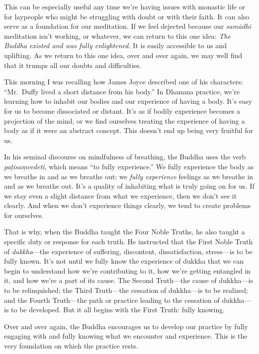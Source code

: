 This can be especially useful any time we're having issues with 
monastic life or for laypeople who might be struggling with doubt or 
with their faith. It can also serve as a foundation for our meditation. 
If we feel dejected because our \emph{samādhi} meditation isn't 
working, or whatever, we can return to this one idea: \emph{The Buddha 
existed and was fully enlightened.} It is easily accessible to us and 
uplifting. As we return to this one idea, over and over again, we may 
well find that it trumps all our doubts and difficulties.


This morning I was recalling how James Joyce described one of his 
characters: ``Mr. Duffy lived a short distance from his body.'' In 
Dhamma practice, we're learning how to inhabit our bodies and our 
experience of having a body. It's easy for us to become dissociated or 
distant. It's as if bodily experience becomes a projection of the mind, 
or we find ourselves treating the experience of having a body as if it 
were an abstract concept. This doesn't end up being very fruitful for 
us.

In his seminal discourse on mindfulness of breathing, the Buddha uses 
the verb \emph{paṭisaṃvedeti}, which means ``to fully experience.'' 
We fully experience the body as we breathe in and as we breathe out; we 
\emph{fully experience} feelings as we breathe in and as we breathe 
out. It's a quality of inhabiting what is truly going on for us. If we 
stay even a slight distance from what we experience, then we don't see 
it clearly. And when we don't experience things clearly, we tend to 
create problems for ourselves.

That is why, when the Buddha taught the Four Noble Truths, he also 
taught a specific duty or response for each truth. He instructed that 
the First Noble Truth of \emph{dukkha}---the experience of suffering, 
discontent, dissatisfaction, stress---is to be fully known. It's not 
until we fully know the experience of dukkha that we can begin to 
understand how we're contributing to it, how we're getting entangled in 
it, and how we're a part of its cause. The Second Truth---the cause of 
dukkha---is to be relinquished; the Third Truth---the cessation of 
dukkha---is to be realized; and the Fourth Truth---the path or practice 
leading to the cessation of dukkha---is to be developed. But it all 
begins with the First Truth: fully knowing.

Over and over again, the Buddha encourages us to develop our practice 
by fully engaging with and fully knowing what we encounter and 
experience. This is the very foundation on which the practice rests.


